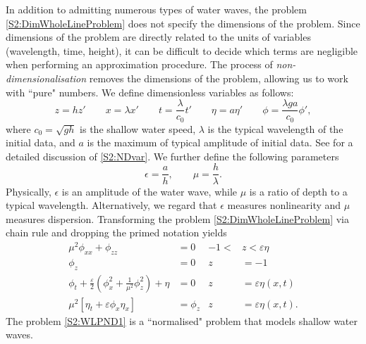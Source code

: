 \documentclass[11pt,reqno,oneside,a4paper]{article}
\begin{document}
In addition to admitting numerous types of water waves, the problem \eqref{S2:DimWholeLineProblem} does not specify the dimensions of the problem. Since dimensions of the problem are directly related to the units of variables (wavelength, time, height), it can be difficult to decide which terms are negligible when performing an approximation procedure. The process of \textit{non-dimensionalisation} removes the dimensions of the problem, allowing us to work with ``pure" numbers. We define dimensionless variables as follows:
\begin{equation}\label{S2:NDvar}
z = hz' \qquad x = \lambda x' \qquad t = \frac{\lambda}{c_0}t' \qquad \eta = a \eta' \qquad \phi = \frac{\lambda g a}{c_0} \phi',
\end{equation}
where $c_0 = \sqrt{gh}$ is the shallow water speed, $\lambda$ is the typical wavelength of the initial data, and $a$ is the maximum of typical amplitude of initial data. See \cite[Sections 1.3.2-1.3.3]{Lannes} for a detailed discussion of \eqref{S2:NDvar}. We further define the following parameters 
\[ \epsilon = \frac{a}{h}, \qquad \mu = \frac{h}{\lambda}.\]
Physically, $\epsilon$ is an amplitude of the water wave, while $\mu$ is a ratio of depth to a typical wavelength. Alternatively, we regard that $\epsilon$ measures nonlinearity and $\mu$ measures dispersion. Transforming the problem \eqref{S2:DimWholeLineProblem} via chain rule and dropping the primed notation yields
\begin{subequations}\label{S2:WLPND1}
\begin{align}
\label{S2:PDEND1}  \mu^2 \phi_{xx} + \phi_{zz} &= 0 &-1 <&z < \varepsilon\eta \\
\label{S2:BC1ND1} \phi_z &= 0 &z &= -1  \\ 
\label{S2:BC2ND1} \phi_{t} + \frac{\varepsilon}{2} \left(\phi_{x}^2 + \frac{1}{\mu^2}\phi_{z}^2\right) + \eta &= 0 &z &= \varepsilon\eta(x,t)\\
\label{S2:BC3ND1} \mu^2 \left[\eta_{t} + \varepsilon \phi_{x} \eta_{x}\right] &= \phi_{z} &z &= \varepsilon\eta(x,t).
\end{align}
\end{subequations}
The problem \eqref{S2:WLPND1} is a ``normalised" problem that models shallow water waves.
\end{document}

